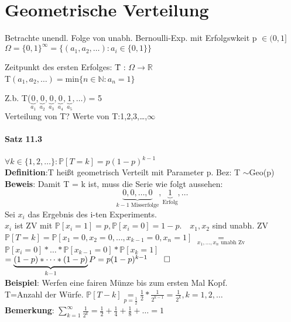 \chapter{Geometrische Verteilung}
Betrachte unendl. Folge von unabh. Bernoulli-Exp. mit Erfolgswkeit p $\in(0,1]$\\
$\Omega = \{0,1\}^\infty= \{(a_1,a_2,\dots):a_i \in \{0,1\}\}$\smallskip\\
\begin{tabbing}
	Zeitpunkt des ersten Erfolges: \= T : $\Omega \rightarrow\mathds{R}$\\
	\> T$(a_1,a_2,\dots)=\text{min}\{n \in \mathds{N}:a_n = 1\}$
\end{tabbing}
Z.b. T($\underbrace{0}_{a_1}, \underbrace{0}_{a_2} , \underbrace{0}_{a_3}, \underbrace{0}_{a_4}, \underbrace{1}_{a_5},\dots)$ = 5\\
Verteilung von T? Werte von T:1,2,3,\dots,$\infty$\medskip\\
\subsubsection{Satz 11.3}
$\forall k \in \{1,2,\dots\}:\mathds{P}[T=k]=p(1-p)^{k-1}$\smallskip\\
\textbf{Definition}:T heißt geometrisch Verteilt mit Parameter p. Bez: T $\sim $Geo(p)\smallskip\\
\textbf{Beweis}: Damit T = k ist, muss die Serie wie folgt aussehen: 
$$\underbrace{0,0,\dots,0}_{k-1 \text{ Misserfolge}},\underbrace{1}_\text{Erfolg},\dots$$
Sei $x_i$ das Ergebnis des i-ten Experiments.\\
$x_i$ ist ZV mit $\mathds{P}[x_i=1]=p, \mathds{P}[x_i=0]=1-p. \quad x_1,x_2 $ sind unabh. ZV\smallskip\\
$\mathds{P}[T=k] = \mathds{P}[x_1=0,x_2=0,\dots,x_{k-1}=0,x_n=1] $
$\underset{x_1,\dots,x_n \text{ unabh Zv}}{=} $\\$\mathds{P}[x_i = 0]* \dots * \mathds{P}[x_{k-1}=0]*\mathds{P}[x_k=1]$\medskip\\
$=\underbrace{(1-p)*\dots*(1-p)}_{k-1}P=p(1-p)^{k-1}\qed$\medskip\\
\textbf{Beispiel}: Werfen eine fairen Münze bis zum ersten Mal Kopf.\\
T=Anzahl der Würfe. $\mathds{P}[T-k] \underset{p=\frac{1}{2}}{=}\frac{1}{2}*\frac{1}{2^{k-1}}=\frac{1}{2^k},k=1,2,\dots$\medskip\\
\textbf{Bemerkung}: $\sum_{k=1}^\infty \frac{1}{2^k}=\frac{1}{2}+\frac{1}{4}+\frac{1}{8}+\dots = 1$\smallskip\\
\medskip\\
